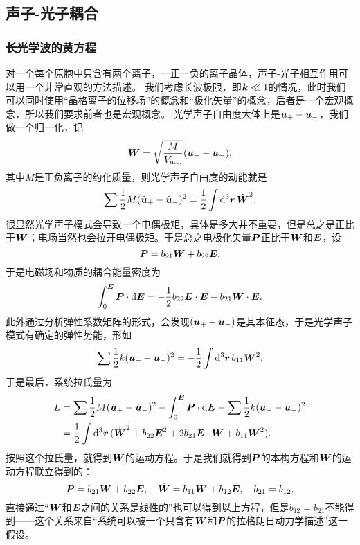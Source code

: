 \subsection{声子-光子耦合}

\subsubsection{长光学波的黄方程}\label{sec:huang-eq}

对一个每个原胞中只含有两个离子，一正一负的离子晶体，声子-光子相互作用可以用一个非常直观的方法描述。
我们考虑长波极限，即$\vb*{k} \ll 1$的情况，此时我们可以同时使用“晶格离子的位移场”的概念和“极化矢量”的概念，后者是一个宏观概念，所以我们要求前者也是宏观概念。
光学声子自由度大体上是$\vb*{u}_+ - \vb*{u}_-$，我们做一个归一化，记
\begin{equation}
    \vb*{W} = \sqrt{\frac{M}{V_\text{u.c.}}} (\vb*{u}_+ - \vb*{u}_-),
\end{equation}
其中$M$是正负离子的约化质量，则光学声子自由度的动能就是
\[
    \sum \frac{1}{2} M (\dot{\vb*{u}}_+ - \dot{\vb*{u}}_-)^2 = \frac{1}{2} \int \dd[3]{\vb*{r}} \dot{\vb*{W}}^2.
\]
很显然光学声子模式会导致一个电偶极矩，具体是多大并不重要，但是总之是正比于$\vb*{W}$；电场当然也会拉开电偶极矩。于是总之电极化矢量$\vb*{P}$正比于$\vb*{W}$和$\vb*{E}$，设
\begin{equation}
    \vb*{P} = b_{21} \vb*{W} + b_{22} \vb*{E},
\end{equation}
于是电磁场和物质的耦合能量密度为
\[
    \int_0^{\vb*{E}} \vb*{P} \cdot \dd{\vb*{E}} = - \frac{1}{2} b_{22} \vb*{E} \cdot \vb*{E} - b_{21} \vb*{W} \cdot \vb*{E}. 
\]
此外通过分析弹性系数矩阵的形式，会发现$(\vb*{u}_+ - \vb*{u}_-)$是其本征态，于是光学声子模式有确定的弹性势能，形如
\[
    \sum \frac{1}{2} k (\vb*{u}_+ - \vb*{u}_-)^2 = - \frac{1}{2} \int \dd[3]{\vb*{r}} b_{11} \vb*{W}^2.
\]
于是最后，系统拉氏量为
\begin{equation}
    \begin{aligned}
        L &= \sum \frac{1}{2} M (\dot{\vb*{u}}_+ - \dot{\vb*{u}}_-)^2 - \int_0^{\vb*{E}} \vb*{P} \cdot \dd{\vb*{E}} - \sum \frac{1}{2} k (\vb*{u}_+ - \vb*{u}_-)^2 \\
        &= \frac{1}{2} \int \dd[3]{\vb*{r}} (\dot{\vb*{W}}^2 + b_{22} \vb*{E}^2 + 2 b_{21} \vb*{E} \cdot \vb*{W} + b_{11} \vb*{W}^2).
    \end{aligned}
\end{equation}
按照这个拉氏量，就得到$\vb*{W}$的运动方程。于是我们就得到$\vb*{P}$的本构方程和$\vb*{W}$的运动方程联立得到的：
\begin{equation}
    \vb*{P} = b_{21} \vb*{W} + b_{22} \vb*{E}, \quad \ddot{\vb*{W}} = b_{11} \vb*{W} + b_{12} \vb*{E}, \quad b_{21} = b_{12}.
    \label{eq:huang-eq}
\end{equation}
直接通过“$\vb*{W}$和$\vb*{E}$之间的关系是线性的”也可以得到以上方程，但是$b_{12} = b_{21}$不能得到——这个关系来自“系统可以被一个只含有$\vb*{W}$和$\vb*{P}$的拉格朗日动力学描述”这一假设。

